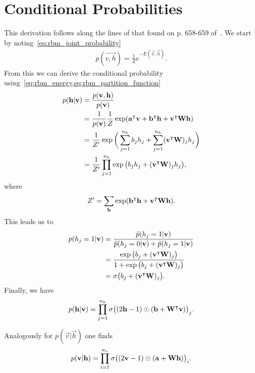 \section{Conditional Probabilities}\label{app:conditional_probabilities_derivation}
This derivation follows along the lines of that found on p. 658-659 of~\cite{goodfellow_deep_learning}.
We start by noting~\cref{eq:rbm_joint_probability}
\begin{align}
    p(\vec{v,h}) = \frac{1}{Z} e^{-E(\vec{v},\vec{h})}.
\end{align}
From this we can derive the conditional probability using~\cref{eq:rbm_energy,eq:rbm_partition_function}
\begin{align}
\begin{split}
    p(\mathbf{h} | \mathbf{v})
        &= \frac{p(\mathbf{v},\mathbf{h})}{p(\mathbf{v})} \\
        &= \frac{1}{p(\mathbf{v})} \frac{1}{Z} \exp( \mathbf{a}^\intercal\mathbf{v} + \mathbf{b}^\intercal\mathbf{h} + \mathbf{v}^\intercal\mathbf{W}\mathbf{h} ) \\
        &= \frac{1}{Z'} \exp\bigg( \sum_{j=1}^{n_h} b_j h_j + \sum_{j=1}^{n_h} (\mathbf{v}^\intercal\mathbf{W})_j h_j \bigg) \\
        &= \frac{1}{Z'} \prod_{j=1}^{n_h} \exp\big( b_j h_j + (\mathbf{v}^\intercal\mathbf{W})_j h_j \big),
\end{split}
\end{align}
where
\begin{align}
    Z' = \sum_{\mathbf{h}} \exp( \mathbf{b}^\intercal\mathbf{h} + \mathbf{v}^\intercal\mathbf{W}\mathbf{h} ).
\end{align}
This leads us to
\begin{align}
\begin{split}
    p(h_j = 1 | \mathbf{v})
        &= \frac{\tilde{p}(h_j = 1 | \mathbf{v})}{\tilde{p}(h_j = 0 | \mathbf{v}) + \tilde{p}(h_j = 1 | \mathbf{v})} \\
        &= \frac{\exp\big( b_j + (\mathbf{v}^\intercal\mathbf{W})_j \big)}{1 + \exp\big( b_j + (\mathbf{v}^\intercal\mathbf{W})_j \big)} \\
        &= \sigma\big( b_j + (\mathbf{v}^\intercal\mathbf{W})_j \big).
\end{split}
\end{align}
Finally, we have
\begin{align}
    p(\mathbf{h} | \mathbf{v}) = \prod_{j=1}^{n_h} \sigma\big( (2\mathbf{h} - 1) \odot (\mathbf{b} + \mathbf{W}^\intercal\mathbf{v}) \big)_j.
\end{align}

Analogously for \( p(\vec{v} | \vec{h}) \) one finds
\begin{align}
    p(\mathbf{v} | \mathbf{h}) = \prod_{i=1}^{n_v} \sigma\big( (2\mathbf{v} - 1) \odot (\mathbf{a} + \mathbf{W}\mathbf{h}) \big)_i.
\end{align}

